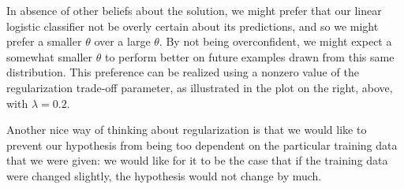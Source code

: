 
In absence of other beliefs about the solution, we might prefer that
our linear logistic classifier not be overly certain about its
predictions, and so we might prefer a smaller $\theta$ over a large
$\theta.$ By not being overconfident, we might expect a somewhat
smaller $\theta$ to perform better on future examples drawn from this
same distribution.  This preference can be realized using a nonzero
value of the regularization trade-off parameter, as illustrated in the
plot on the right, above, with $\lambda=0.2$.

Another nice way of thinking about regularization is that we
would like to prevent our hypothesis from being too dependent on the
particular training data that we were given: we would like for it to
be the case that if the training data were changed slightly, the
hypothesis would not change by much.


% 
% 
% 



